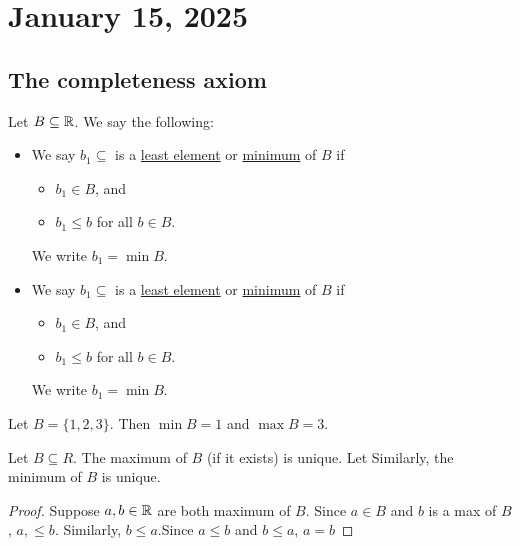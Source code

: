 \documentclass[11pt]{article}
\begin{document}
\section{January 15, 2025}
\subsection{The completeness axiom}
Let \(B \subseteq \mathbb R\). We say the following:
\begin{itemize}
    \item We say \(b_1 \subseteq\) is a \underline{least element} or \underline{minimum}
          of \(B\) if
          \begin{itemize}
              \item \(b_1 \in B\), and
              \item \(b_1 \leq b\) for all \(b \in B\).
          \end{itemize}
          We write \(b_1 = \min B\).

    \item We say \(b_1 \subseteq\) is a \underline{least element} or \underline{minimum}
          of \(B\) if
          \begin{itemize}
              \item \(b_1 \in B\), and
              \item \(b_1 \leq b\) for all \(b \in B\).
          \end{itemize}
          We write \(b_1 = \min B\).
\end{itemize}
\begin{example}
    Let \(B = \{1, 2, 3\}\). Then \(\min B = 1\) and \(\max B = 3\).
\end{example}

\begin{proposition}
    Let \(B \subseteq R\). The maximum of \(B\) (if it exists) is unique. Let Similarly, the minimum of \(B\) is unique.
\end{proposition}
\begin{proof}
    Suppose \(a, b \in \mathbb R\) are both maximum of \(B\). Since \(a \in B\) and \(b\) is a max of \(B\), \(a ,\leqslant b\). Similarly, \(b \leqslant a\).Since \(a \leqslant b\) and \(b \leqslant a\), \(a = b\)
\end{proof}
\end{document}
